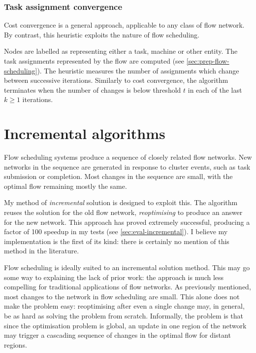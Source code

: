 \subsubsection{Task assignment convergence}

Cost convergence is a general approach, applicable to any class of flow network. By contrast, this heuristic exploits the nature of flow scheduling.

Nodes are labelled as representing either a task, machine or other entity. The task assignments represented by the flow are computed (see \cref{sec:prep-flow-scheduling}). The heuristic measures the number of assignments which change between successive iterations. Similarly to cost convergence, the algorithm terminates when the number of changes is below threshold $t$ in each of the last $k \geq 1$ iterations.


\section{Incremental algorithms} \label{sec:impl-incremental}


Flow scheduling systems produce a sequence of closely related flow networks. New networks in the sequence are generated in response to cluster events, such as task submission or completion. Most changes in the sequence are small, with the optimal flow remaining mostly the same.

My method of \emph{incremental} solution is designed to exploit this. The algorithm reuses the solution for the old flow network, \emph{reoptimising} to produce an answer for the new network. This approach has proved extremely successful, producing a factor of 100 speedup in my tests (see \cref{sec:eval-incremental}). I believe my implementation is the first of its kind: there is certainly no mention of this method in the literature.

Flow scheduling is ideally suited to an incremental solution method. This may go some way to explaining the lack of prior work: the approach is much less compelling for traditional applications of flow networks. As previously mentioned, most changes to the network in flow scheduling are small. This alone does not make the problem easy: reoptimising after even a single change may, in general, be as hard as solving the problem from scratch\footnotemark. Informally, the problem is that since the optimisation problem is global, an update in one region of the network may trigger a cascading sequence of changes in the optimal flow for distant regions.

